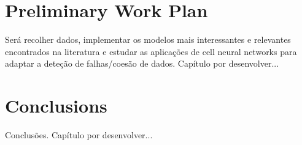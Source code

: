 \chapter{Preliminary Work Plan} \label{chap:chap3}

Será recolher dados, implementar os modelos mais interessantes e relevantes encontrados na literatura e estudar as aplicações de cell neural networks para adaptar a deteção de falhas/coesão de dados. Capítulo por desenvolver...

\chapter{Conclusions}

Conclusões. Capítulo por desenvolver...